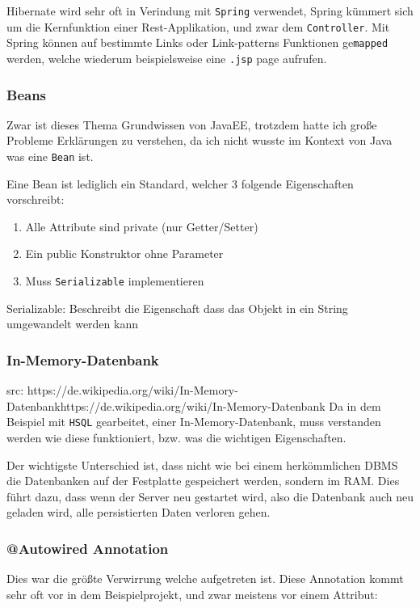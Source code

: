 Hibernate wird sehr oft in Verindung mit \verb|Spring| verwendet, Spring kümmert sich um die Kernfunktion einer Rest-Applikation, und zwar dem \verb|Controller|. Mit Spring können auf bestimmte Links oder Link-patterns Funktionen ge\verb|mapped| werden, welche wiederum beispielsweise eine \verb|.jsp| page aufrufen. 

\subsubsection{Beans}
Zwar ist dieses Thema Grundwissen von JavaEE, trotzdem hatte ich große Probleme Erklärungen zu verstehen, da ich nicht wusste im Kontext von Java was eine \verb|Bean| ist. 

Eine Bean ist lediglich ein Standard, welcher 3 folgende Eigenschaften vorschreibt:

\begin{enumerate}
	\item Alle Attribute sind private (nur Getter/Setter)
	\item Ein public Konstruktor ohne Parameter
	\item Muss \verb|Serializable| implementieren
\end{enumerate}
	
Serializable: Beschreibt die Eigenschaft dass das Objekt in ein String umgewandelt werden kann

\subsubsection{In-Memory-Datenbank}

src: {https://de.wikipedia.org/wiki/In-Memory-Datenbank}{https://de.wikipedia.org/wiki/In-Memory-Datenbank}
Da in dem Beispiel mit \verb|HSQL| gearbeitet, einer In-Memory-Datenbank, muss verstanden werden wie diese funktioniert, bzw. was die wichtigen Eigenschaften.

Der wichtigste Unterschied ist, dass nicht wie bei einem herkömmlichen DBMS die Datenbanken auf der Festplatte gespeichert werden, sondern im RAM. Dies führt dazu, dass wenn der Server neu gestartet wird, also die Datenbank auch neu geladen wird, alle persistierten Daten verloren gehen.


\subsubsection{@Autowired Annotation}
Dies war die größte Verwirrung welche aufgetreten ist. Diese Annotation kommt sehr oft vor in dem Beispielprojekt, und zwar meistens vor einem Attribut:

